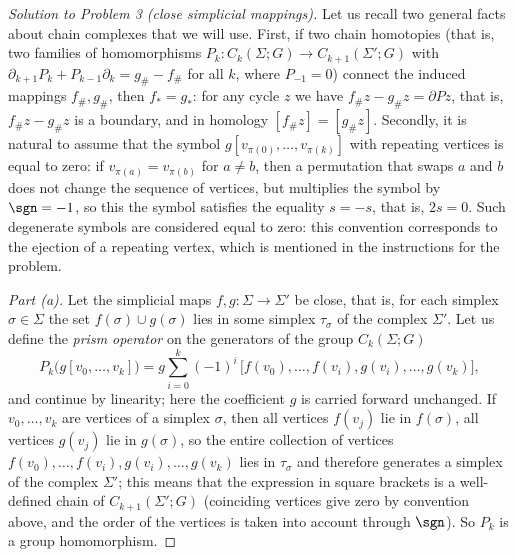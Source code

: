 \documentclass[a4paper,12pt]{report}
\begin{document}
\begin{proof}[Solution to Problem \textup{3} \textup{(}close simplicial mappings\textup{)}]
Let us recall two general facts about chain complexes that we will use. First, if two chain homotopies \textup{(}that is, two families of homomorphisms $P_k\colon C_k(\Sigma;G)\to C_{k+1}(\Sigma';G)$ with $\partial_{k+1}P_k+P_{k-1}\partial_k=g_\#-f_\#$ for all $k$, where $P_{-1}=0$\textup{)} connect the induced mappings $f_\#,g_\#$, then $f_*=g_*$: for any cycle $z$ we have $f_\#z-g_\#z=\partial P z$, that is, $f_\#z-g_\#z$ is a boundary, and in homology $[f_\#z]=[g_\#z]$. Secondly, it is natural to assume that the symbol $g[v_{\pi(0)},\dots,v_{\pi(k)}]$ with repeating vertices is equal to zero: if $v_{\pi(a)}=v_{\pi(b)}$ for $a\ne b$, then a permutation that swaps $a$ and $b$ does not change the sequence of vertices, but multiplies the symbol by $\sgn=-1$, so this the symbol satisfies the equality $s=-s$, that is, $2s=0$. Such degenerate symbols are considered equal to zero: this convention corresponds to the ejection of a repeating vertex, which is mentioned in the instructions for the problem.

\textit{Part \textup{(a)}.} Let the simplicial maps $f,g\colon\Sigma\to\Sigma'$ be close, that is, for each simplex $\sigma\in\Sigma$ the set $f(\sigma)\cup g(\sigma)$ lies in some simplex $\tau_\sigma$ of the complex $\Sigma'$. Let us define the \emph{prism operator} on the generators of the group $C_k(\Sigma;G)$
\[
P_k\bigl(g[v_0,\dots,v_k]\bigr)=g\sum_{i=0}^{k}(-1)^i\,\bigl[f(v_0),\dots,f(v_i),g(v_i),\dots,g(v_k)\bigr],
\]
and continue by linearity; here the coefficient $g$ is carried forward unchanged. If $v_0,\dots,v_k$ are vertices of a simplex $\sigma$, then all vertices $f(v_j)$ lie in $f(\sigma)$, all vertices $g(v_j)$ lie in $g(\sigma)$, so the entire collection of vertices $f(v_0),\dots,f(v_i),g(v_i),\dots,g(v_k)$ lies in $\tau_\sigma$ and therefore generates a simplex of the complex $\Sigma'$; this means that the expression in square brackets is a well-defined chain of $C_{k+1}(\Sigma';G)$ \textup{(}coinciding vertices give zero by convention above, and the order of the vertices is taken into account through $\sgn$\textup{)}. So $P_k$ is a group homomorphism.


\end{proof}
\end{document}
